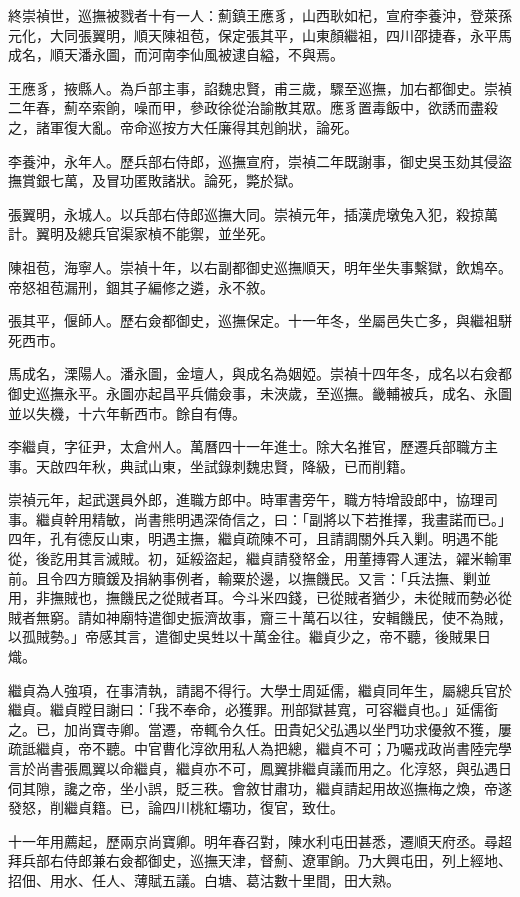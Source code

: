\begin{pinyinscope}
終崇禎世，巡撫被戮者十有一人：薊鎮王應豸，山西耿如杞，宣府李養沖，登萊孫元化，大同張翼明，順天陳祖苞，保定張其平，山東顏繼祖，四川邵捷春，永平馬成名，順天潘永圖，而河南李仙風被逮自縊，不與焉。

王應豸，掖縣人。為戶部主事，諂魏忠賢，甫三歲，驟至巡撫，加右都御史。崇禎二年春，薊卒索餉，噪而甲，參政徐從治諭散其眾。應豸置毒飯中，欲誘而盡殺之，諸軍復大亂。帝命巡按方大任廉得其剋餉狀，論死。

李養沖，永年人。歷兵部右侍郎，巡撫宣府，崇禎二年既謝事，御史吳玉劾其侵盜撫賞銀七萬，及冒功匿敗諸狀。論死，斃於獄。

張翼明，永城人。以兵部右侍郎巡撫大同。崇禎元年，插漢虎墩兔入犯，殺掠萬計。翼明及總兵官渠家楨不能禦，並坐死。

陳祖苞，海寧人。崇禎十年，以右副都御史巡撫順天，明年坐失事繫獄，飲鴆卒。帝怒祖苞漏刑，錮其子編修之遴，永不敘。

張其平，偃師人。歷右僉都御史，巡撫保定。十一年冬，坐屬邑失亡多，與繼祖駢死西市。

馬成名，溧陽人。潘永圖，金壇人，與成名為姻婭。崇禎十四年冬，成名以右僉都御史巡撫永平。永圖亦起昌平兵備僉事，未浹歲，至巡撫。畿輔被兵，成名、永圖並以失機，十六年斬西市。餘自有傳。

李繼貞，字征尹，太倉州人。萬曆四十一年進士。除大名推官，歷遷兵部職方主事。天啟四年秋，典試山東，坐試錄刺魏忠賢，降級，已而削籍。

崇禎元年，起武選員外郎，進職方郎中。時軍書旁午，職方特增設郎中，協理司事。繼貞幹用精敏，尚書熊明遇深倚信之，曰：「副將以下若推擇，我畫諾而已。」四年，孔有德反山東，明遇主撫，繼貞疏陳不可，且請調關外兵入剿。明遇不能從，後訖用其言滅賊。初，延綏盜起，繼貞請發帑金，用董摶霄人運法，糴米輸軍前。且令四方贖鍰及捐納事例者，輸粟於邊，以撫饑民。又言：「兵法撫、剿並用，非撫賊也，撫饑民之從賊者耳。今斗米四錢，已從賊者猶少，未從賊而勢必從賊者無窮。請如神廟特遣御史振濟故事，齎三十萬石以往，安輯饑民，使不為賊，以孤賊勢。」帝感其言，遣御史吳甡以十萬金往。繼貞少之，帝不聽，後賊果日熾。

繼貞為人強項，在事清執，請謁不得行。大學士周延儒，繼貞同年生，屬總兵官於繼貞。繼貞瞠目謝曰：「我不奉命，必獲罪。刑部獄甚寬，可容繼貞也。」延儒銜之。已，加尚寶寺卿。當遷，帝輒令久任。田貴妃父弘遇以坐門功求優敘不獲，屢疏詆繼貞，帝不聽。中官曹化淳欲用私人為把總，繼貞不可；乃囑戎政尚書陸完學言於尚書張鳳翼以命繼貞，繼貞亦不可，鳳翼排繼貞議而用之。化淳怒，與弘遇日伺其隙，讒之帝，坐小誤，貶三秩。會敘甘肅功，繼貞請起用故巡撫梅之煥，帝遂發怒，削繼貞籍。已，論四川桃紅壩功，復官，致仕。

十一年用薦起，歷兩京尚寶卿。明年春召對，陳水利屯田甚悉，遷順天府丞。尋超拜兵部右侍郎兼右僉都御史，巡撫天津，督薊、遼軍餉。乃大興屯田，列上經地、招佃、用水、任人、薄賦五議。白塘、葛沽數十里間，田大熟。


\end{pinyinscope}
